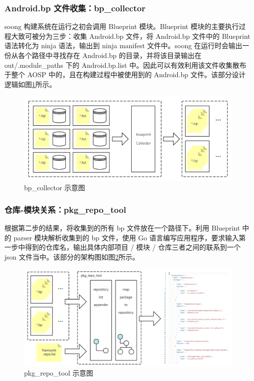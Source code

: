 \subsubsection{Android.bp 文件收集：bp\_collector}

soong 构建系统在运行之初会调用 Blueprint 模块。Blueprint 模块的主要执行过程大致可被分为三步：收集 Android.bp 文件，将 Android.bp 文件中的 Blueprint 语法转化为 ninja 语法，输出到 ninja manifest 文件中。soong 在运行时会输出一份从各个路径中寻找存在 Android.bp 的目录，并将该目录输出在 out/.module\_paths 下的 Android.bp.list 中。因此可以有效利用该文件收集散布于整个 AOSP 中的，且在构建过程中被使用到的 Android.bp 文件。该部分设计逻辑如图\ref{fig:archi-bp-collector}所示。

\begin{figure}[htb]
    \centering
    \includegraphics[width=.9\textwidth]{figures/archi-bp-collector.png}
    \caption{bp\_collector 示意图}
    \label{fig:archi-bp-collector}
\end{figure}

\subsubsection{仓库-模块关系：pkg\_repo\_tool}

根据第二步的结果，将收集到的所有 bp 文件放在一个路径下。利用 Blueprint 中的 parser 模块解析收集到的 bp 文件，使用 Go 语言编写应用程序，要求输入第一步中得到的仓库名，输出具体内部项目 / 模块 / 仓库三者之间的联系到一个 json 文件当中。该部分的架构图如图\ref{fig:archi-pkg-repo-tool}所示。

\begin{figure}[htb]
    \centering
    \includegraphics[width=.9\textwidth]{figures/archi-pkg-repo-tool.png}
    \caption{pkg\_repo\_tool 示意图}
    \label{fig:archi-pkg-repo-tool}
\end{figure}

